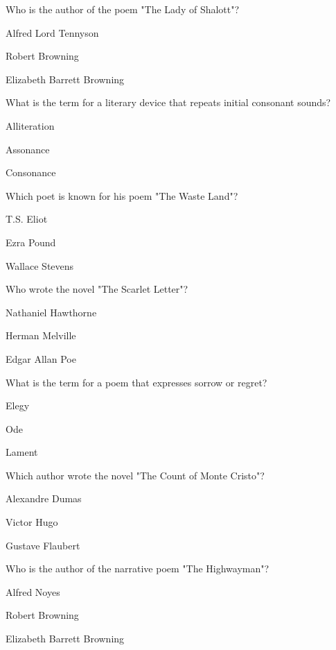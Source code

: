 \begin{enhancedmcq}{Who is the author of the poem "The Lady of Shalott"?}
\item Alfred Lord Tennyson
\item Robert Browning
\item Elizabeth Barrett Browning

\end{enhancedmcq}
\begin{enhancedmcq}{What is the term for a literary device that repeats initial consonant sounds?}
\item Alliteration
\item Assonance
\item Consonance

\end{enhancedmcq}
\begin{enhancedmcq}{Which poet is known for his poem "The Waste Land"?}
\item T.S. Eliot
\item Ezra Pound
\item Wallace Stevens

\end{enhancedmcq}
\begin{enhancedmcq}{Who wrote the novel "The Scarlet Letter"?}
\item Nathaniel Hawthorne
\item Herman Melville
\item Edgar Allan Poe

\end{enhancedmcq}
\begin{enhancedmcq}{What is the term for a poem that expresses sorrow or regret?}
\item Elegy
\item Ode
\item Lament

\end{enhancedmcq}
\begin{enhancedmcq}{Which author wrote the novel "The Count of Monte Cristo"?}
\item Alexandre Dumas
\item Victor Hugo
\item Gustave Flaubert

\end{enhancedmcq}
\begin{enhancedmcq}{Who is the author of the narrative poem "The Highwayman"?}
\item Alfred Noyes
\item Robert Browning
\item Elizabeth Barrett Browning

\end{enhancedmcq}
